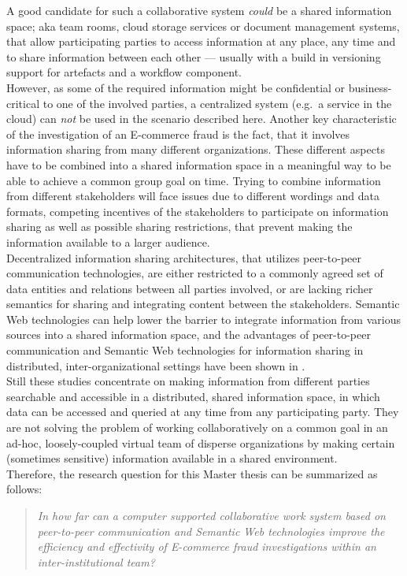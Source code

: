 A good candidate for such a collaborative system \emph{could} be a shared information space; aka team rooms, cloud storage services or document management systems, that allow participating parties to access information at any place, any time and to share information between each other --- usually with a build in versioning support for artefacts and a workflow component. \\

However, as some of the required information might be confidential or business-critical to one of the involved parties, a centralized system (e.g.\ a service in the cloud) can \emph{not} be used in the scenario described here. Another key characteristic of the investigation of an \gls{E-commerce} fraud is the fact, that it involves information sharing from many different organizations. These different aspects have to be combined into a shared information space in a meaningful way to be able to achieve a common group goal on time. Trying to combine information from different stakeholders will face issues due to different wordings and data formats, competing incentives of the stakeholders to participate on information sharing as well as possible sharing restrictions, that prevent making the information available to a larger audience. \\

Decentralized information sharing architectures, that utilizes peer-to-peer communication technologies, are either restricted to a commonly agreed set of data entities and relations between all parties involved, or are lacking richer semantics for sharing and integrating content between the stakeholders. Semantic Web technologies can help lower the barrier to integrate information from various sources into a shared information space, and the advantages of peer-to-peer communication and Semantic Web technologies for information sharing in distributed, inter-organizational settings have been shown in \citep{Staab2006}. \\

Still these studies concentrate on making information from different parties searchable and accessible in a distributed, shared information space, in which data can be accessed and queried at any time from any participating party. They are not solving the problem of working collaboratively on a common goal in an ad-hoc, loosely-coupled virtual team of disperse organizations by making certain (sometimes sensitive) information available in a shared environment. \\

Therefore, the research question for this Master thesis can be summarized as follows: \@

\begin{quotation}
  \textit{In how far can a computer supported collaborative work system based on peer-to-peer communication and Semantic Web technologies improve the efficiency and effectivity of \gls{E-commerce} fraud investigations within an inter-institutional team?}
\end{quotation}

